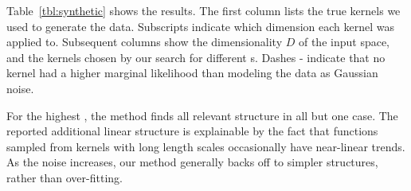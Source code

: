 



Table~\ref{tbl:synthetic} shows the results.
The first column lists the true kernels we used to generate the data.
Subscripts indicate which dimension each kernel was applied to.
Subsequent columns show the dimensionality $D$ of the input space, and the kernels chosen by our search for different \SNR{}s.
Dashes - indicate that no kernel had a higher marginal likelihood than modeling the data as \iid Gaussian noise. %

For the highest \SNR{}, the method finds all relevant structure in all but one case.
The reported additional linear structure is explainable by the fact that functions sampled from \kSE{} kernels with long length scales occasionally have near-linear trends.
%
As the noise increases, our method generally backs off to simpler structures, rather than over-fitting.





